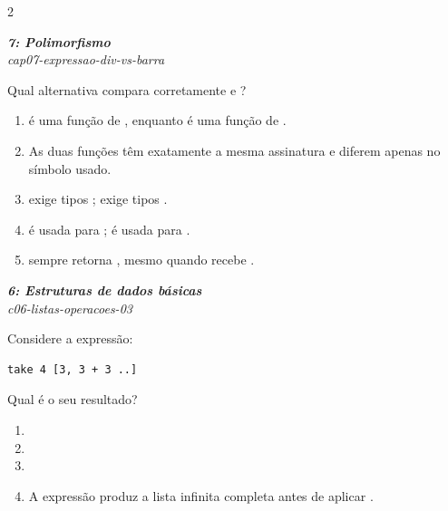 \documentclass[a4paper,10pt,brazil]{article}
\begin{document}
\begin{multicols}{2}
\begin{enumerate}
\end{enumerate}

\begin{flushright}
  \footnotesize
  \textit{\textbf{7: Polimorfismo}}\\
  \textit{cap07-expressao-div-vs-barra}\\

\end{flushright}
Qual alternativa compara corretamente  e \haskellinline{(/)}?
\begin{enumerate}
  \item {} é uma função de , enquanto \haskellinline{(/)} é uma função de .
  \item As duas funções têm exatamente a mesma assinatura e diferem apenas no símbolo usado.
  \item {} exige tipos ; \haskellinline{(/)} exige tipos .
  \item {} é usada para ; \haskellinline{(/)} é usada para .
  \item \haskellinline{(/)} sempre retorna , mesmo quando recebe .

\end{enumerate}

\begin{flushright}
  \footnotesize
  \textit{\textbf{6: Estruturas de dados básicas}}\\
  \textit{c06-listas-operacoes-03}\\

\end{flushright}
Considere a expressão:
\begin{verbatim}
take 4 [3, 3 + 3 ..]
\end{verbatim}
Qual é o seu resultado?

\begin{enumerate}
  \item \haskellinline{ [3,6,9] }

  \item \haskellinline{ [3,6,9,12] }

  \item \haskellinline{ [6,9,12,15] }

  \item A expressão produz a lista infinita completa antes de aplicar .


\end{enumerate}
\end{multicols}
\end{document}
